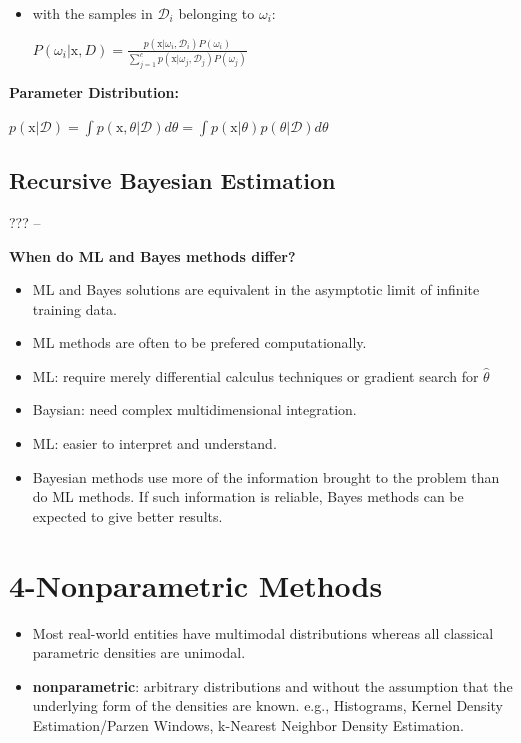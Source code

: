 \documentclass{../cheat}
\begin{document}
\begin{multicols}{3}
\begin{itemize}[nolistsep, leftmargin=1em]
				\item with the samples in $\mathcal{D}_i$ belonging to $\omega_i$:\\
					\centerline{$P(\omega_i|\mathrm{x},D) = \frac{p(\mathrm{x}|\omega_i,\mathcal{D}_i)P(\omega_i)}{\sum^c_{j=1} p(\mathrm{x}|\omega_j ,\mathcal{D}_j) P(\omega_j)}$}
			\end{itemize}
			
			\textbf{Parameter Distribution:}\\
			\centerline{$p(\mathrm{x}|\mathcal{D}) = \int p(\mathrm{x}, \theta | \mathcal{D}) d\theta = \int p(\mathrm{x}| \theta) p(\theta | \mathcal{D}) d\theta$}
			
		\subsection{Recursive Bayesian Estimation}
			???	
	--
		
			\textbf{When do ML and Bayes methods differ?}
			\begin{itemize}
				\item ML and Bayes solutions are equivalent in the
asymptotic limit of infinite training data.
				\item ML methods are often to be prefered computationally.
				\item ML: require merely differential calculus techniques or gradient search for $\hat{\theta}$
				\item Baysian: need complex multidimensional integration.
				\item ML: easier to interpret and understand.
				\item Bayesian methods use more of the information brought to the problem than do ML methods. If such information is reliable, Bayes methods can be expected to give better results.
			\end{itemize}	


	\section{4-Nonparametric Methods}
		\begin{itemize}
			\item Most real-world entities have multimodal distributions whereas all classical parametric densities are unimodal.
			\item \textbf{nonparametric}: arbitrary distributions and without the assumption that the underlying form of the densities are known. e.g., Histograms, Kernel Density Estimation/Parzen Windows, k-Nearest Neighbor Density Estimation.
		\end{itemize}
		

\end{multicols}
\end{document}
